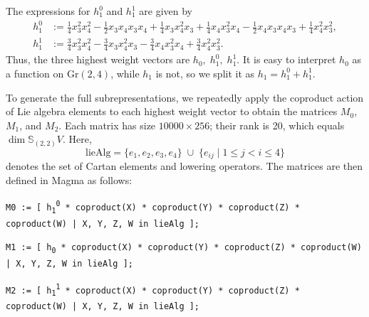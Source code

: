 \documentclass{amsart}
\begin{document}
The expressions for $h_{1}^{0}$ and $h_{1}^{1}$ are given by 
\[
\begin{aligned}
h_1^0 &:= \frac{1}{4} x_3^2 x_4^2
- \frac{1}{2} x_3 x_4 x_3 x_4
+ \frac{1}{4} x_3 x_4^2 x_3
+ \frac{1}{4} x_4 x_3^2 x_4
- \frac{1}{2} x_4 x_3 x_4 x_3
+ \frac{1}{4} x_4^2 x_3^2,\\
h_1^1 &:= \frac{3}{4} x_3^2 x_4^2
- \frac{3}{4} x_3 x_4^2 x_3
- \frac{3}{4} x_4 x_3^2 x_4
+ \frac{3}{4} x_4^2 x_3^2.
\end{aligned}
\]
Thus, the three highest weight vectors are $h_0, \; h_1^0, \; h_1^1.$ It is easy to interpret $h_0$ as a function on $\mathrm{Gr}(2,4)$, while $h_1$ is not, so we split it as $h_1 = h_1^0 + h_1^1$.

To generate the full subrepresentations, we repeatedly apply the coproduct action of Lie algebra elements to each highest weight vector to obtain the matrices $M_0$, $M_1$, and $M_2$. Each matrix has size $10000 \times 256$; their rank is 20, which equals $\dim \mathbb{S}_{(2,2)} V$. Here,
\[
\text{lieAlg} = \{ e_1, e_2, e_3, e_4 \} \;\cup\; \{ e_{ij} \mid 1 \le j < i \le 4 \} 
\]
denotes the set of Cartan elements and lowering operators. The matrices are then defined in Magma as follows:
\begin{flushleft} 
\texttt{M0 := [ h\textsubscript{1}\textsuperscript{0} * coproduct(X) * coproduct(Y) * coproduct(Z) * coproduct(W) | X, Y, Z, W in lieAlg ];}
\end{flushleft}

\begin{flushleft} 
\texttt{M1 := [ h\textsubscript{0} * coproduct(X) * coproduct(Y) * coproduct(Z) * coproduct(W) | X, Y, Z, W in lieAlg ];}
\end{flushleft}

\begin{flushleft} 
\texttt{M2 := [ h\textsubscript{1}\textsuperscript{1} * coproduct(X) * coproduct(Y) * coproduct(Z) * coproduct(W) | X, Y, Z, W in lieAlg ];}
\end{flushleft}
\end{document}
